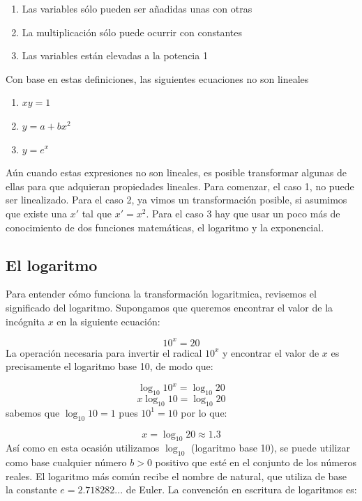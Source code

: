 \documentclass[
]{book}
\providecommand{\tightlist}{%
  \setlength{\itemsep}{0pt}\setlength{\parskip}{0pt}}
\begin{document}
\begin{enumerate}
\def\labelenumi{\arabic{enumi}.}
\tightlist
\item
  Las variables sólo pueden ser añadidas unas con otras
\item
  La multiplicación sólo puede ocurrir con constantes
\item
  Las variables están elevadas a la potencia 1
\end{enumerate}

Con base en estas definiciones, las siguientes ecuaciones no son lineales

\begin{enumerate}
\def\labelenumi{\arabic{enumi}.}
\tightlist
\item
  \(xy = 1\)
\item
  \(y = a + b x^2\)
\item
  \(y = e^x\)
\end{enumerate}

Aún cuando estas expresiones no son lineales, es posible transformar algunas de ellas para que adquieran propiedades lineales. Para comenzar, el caso 1, no puede ser linealizado. Para el caso 2, ya vimos un transformación posible, si asumimos que existe una \(x'\) tal que \(x' = x^2\). Para el caso 3 hay que usar un poco más de conocimiento de dos funciones matemáticas, el logaritmo y la exponencial.

\hypertarget{el-logaritmo}{%
\subsection{El logaritmo}\label{el-logaritmo}}

Para entender cómo funciona la transformación logaritmica, revisemos el significado del logaritmo. Supongamos que queremos encontrar el valor de la incógnita \(x\) en la siguiente ecuación:

\[10^x = 20\]
La operación necesaria para invertir el radical \(10^x\) y encontrar el valor de \(x\) es precisamente el logaritmo base 10, de modo que:

\[\log_{10} 10^x = \log_{10} 20\]
\[x \log_{10} 10 = \log_{10} 20\]
sabemos que \(\log_{10} 10 = 1\) pues \(10^1 = 10\) por lo que:

\[x = \log_{10} 20 \approx 1.3\]
Así como en esta ocasión utilizamos \(\log_{10}\) (logaritmo base 10), se puede utilizar como base cualquier número \(b > 0\) positivo que esté en el conjunto de los números reales. El logaritmo más común recibe el nombre de natural, que utiliza de base la constante \(e = 2.718282 ...\) de Euler. La convención en escritura de logaritmos es:
\end{document}
